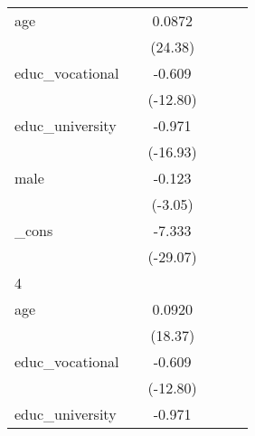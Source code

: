 {\begin{tabular}{l*{5}{c}}
age         &                     &      0.0872\sym{***}&                     &                     &                     \\
            &                     &     (24.38)         &                     &                     &                     \\
[1em]
educ\_vocational&                     &      -0.609\sym{***}&                     &                     &                     \\
            &                     &    (-12.80)         &                     &                     &                     \\
[1em]
educ\_university&                     &      -0.971\sym{***}&                     &                     &                     \\
            &                     &    (-16.93)         &                     &                     &                     \\
[1em]
male        &                     &      -0.123\sym{**} &                     &                     &                     \\
            &                     &     (-3.05)         &                     &                     &                     \\
[1em]
\_cons      &                     &      -7.333\sym{***}&                     &                     &                     \\
            &                     &    (-29.07)         &                     &                     &                     \\
\hline
4           &                     &                     &                     &                     &                     \\
age         &                     &      0.0920\sym{***}&                     &                     &                     \\
            &                     &     (18.37)         &                     &                     &                     \\
[1em]
educ\_vocational&                     &      -0.609\sym{***}&                     &                     &                     \\
            &                     &    (-12.80)         &                     &                     &                     \\
[1em]
educ\_university&                     &      -0.971\sym{***}&                     &                     &                     \\

\end{tabular}}
